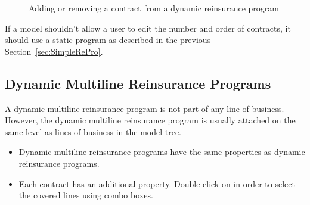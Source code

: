 \begin{figure}
  \centering
  \caption{Adding or removing a contract from a dynamic reinsurance program}
  \label{fig:HowToAddOrRemoveReinsuranceContracts}
\end{figure}

If a model shouldn't allow a user to edit the number and order of contracts, it should use a static program as described in the previous Section~\ref{sec:SimpleRePro}.

\subsection{Dynamic Multiline Reinsurance Programs}
\label{sec:DynamicMultiRePro}

A dynamic multiline reinsurance program is not part of any line of business. However, the dynamic multiline reinsurance program is usually attached on the same level as lines of business in the model tree.

\begin{itemize}
	\item Dynamic multiline reinsurance programs have the same properties as dynamic reinsurance programs.
	\item Each contract has an additional  property. Double-click on  in order to select the covered lines using combo boxes.
\end{itemize}


